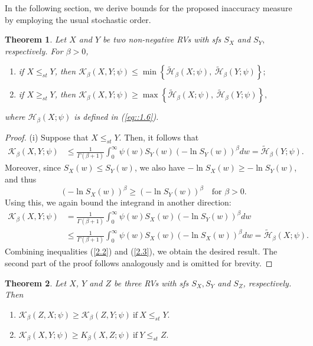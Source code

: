 \documentclass[12pt,a4paper]{article}
\numberwithin{equation}{section}
\newtheorem{theorem}{Theorem}[section]
\begin{document}
 In the following section, we derive bounds for the proposed inaccuracy measure by employing the usual stochastic order.
		\begin{theorem}
		Let $X$ and $Y$  be two non-negative RVs with sfs $S_X$ and ${S}_Y,$  respectively.  For $\beta>0$,
		\begin{enumerate}
			\item[(i)] if $X\leq_{st}Y$, then $ \mathcal K_\beta(X,Y;\psi)\leq 	\min\left\{  \tilde{\mathcal H}_\beta(X;\psi),~  \tilde{\mathcal H}_\beta(Y;\psi)\right\};$
		\item[(ii)] if $X\geq_{st}Y$, then $ \mathcal K_\beta(X,Y;\psi)\geq 	\max\left\{ \tilde{\mathcal H}_\beta(X;\psi),~ \tilde{\mathcal H}_\beta(Y;\psi)\right\},$
		\end{enumerate}
		where $\mathcal H_\beta(X;\psi)$ is defined in (\ref{eq::1.6}).
	\end{theorem}
\begin{proof}
	(i) Suppose that $X \leq_{st} Y$. Then, it follows that
	\begin{align}\label{2.2}
		\mathcal{K}_\beta(X,Y;\psi) &\leq \frac{1}{\Gamma(\beta+1)}\int_0^{\infty} \psi(w) S_Y(w) \left( -\ln S_Y(w) \right)^\beta dw =  \tilde{\mathcal H}_\beta(Y;\psi).
	\end{align}	
	Moreover, since $S_X(w) \leq S_Y(w)$, we also have $-\ln S_X(w) \geq -\ln S_Y(w)$, and thus
	$$
	\left( -\ln S_X(w) \right)^\beta \geq \left( -\ln S_Y(w) \right)^\beta \quad \text{for } \beta > 0.
	$$
	Using this, we again bound the integrand in another direction:
	\begin{align}\label{2.3}
		\mathcal{K}_\beta(X,Y;\psi) &=\frac{1}{\Gamma(\beta+1)} \int_0^{\infty} \psi(w) S_X(w) \left( -\ln\nonumber S_Y(w)\nonumber \right)^\beta dw \\
		&\leq\frac{1}{\Gamma(\beta+1)} \int_0^{\infty} \psi(w) S_X(w) \left( -\ln S_X(w) \right)^\beta dw = \tilde{\mathcal H}_\beta(X;\psi).
	\end{align}
	Combining inequalities (\ref{2.2}) and (\ref{2.3}), we obtain the desired result. The second part of the proof follows analogously and is omitted for brevity.
\end{proof}
	\begin{theorem}
		Let $X$, $Y$ and $Z$ be three RVs with sfs $S_X, S_Y$ and $S_Z$, respectively.  Then 
		\begin{enumerate}
			\item[(i)] $\mathcal K_\beta(Z,X;\psi)\geq 	\mathcal K_\beta(Z,Y;\psi)~\text{if}~X\leq_{st}Y.$
			\item[(ii)] $\mathcal K_\beta(X,Y;\psi)\geq 	K_\beta(X,Z;\psi)~\text{if}~Y\leq_{st}Z.$
		\end{enumerate}
	\end{theorem}
\end{document}
